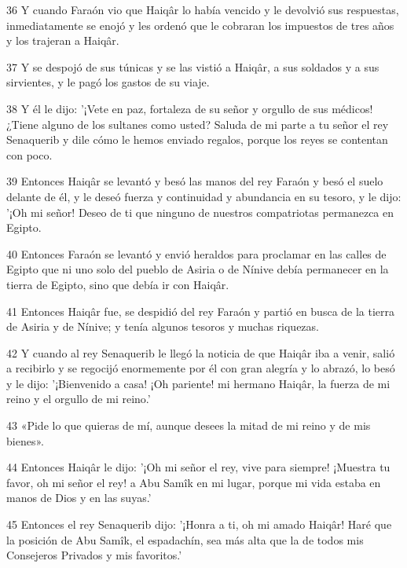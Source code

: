 \par 36 Y cuando Faraón vio que Haiqâr lo había vencido y le devolvió sus respuestas, inmediatamente se enojó y les ordenó que le cobraran los impuestos de tres años y los trajeran a Haiqâr.

\par 37 Y se despojó de sus túnicas y se las vistió a Haiqâr, a sus soldados y a sus sirvientes, y le pagó los gastos de su viaje.

\par 38 Y él le dijo: '¡Vete en paz, fortaleza de su señor y orgullo de sus médicos! ¿Tiene alguno de los sultanes como usted? Saluda de mi parte a tu señor el rey Senaquerib y dile cómo le hemos enviado regalos, porque los reyes se contentan con poco.

\par 39 Entonces Haiqâr se levantó y besó las manos del rey Faraón y besó el suelo delante de él, y le deseó fuerza y ​​continuidad y abundancia en su tesoro, y le dijo: '¡Oh mi señor! Deseo de ti que ninguno de nuestros compatriotas permanezca en Egipto.

\par 40 Entonces Faraón se levantó y envió heraldos para proclamar en las calles de Egipto que ni uno solo del pueblo de Asiria o de Nínive debía permanecer en la tierra de Egipto, sino que debía ir con Haiqâr.

\par 41 Entonces Haiqâr fue, se despidió del rey Faraón y partió en busca de la tierra de Asiria y de Nínive; y tenía algunos tesoros y muchas riquezas.

\par 42 Y cuando al rey Senaquerib le llegó la noticia de que Haiqâr iba a venir, salió a recibirlo y se regocijó enormemente por él con gran alegría y lo abrazó, lo besó y le dijo: '¡Bienvenido a casa! ¡Oh pariente! mi hermano Haiqâr, la fuerza de mi reino y el orgullo de mi reino.'

\par 43 «Pide lo que quieras de mí, aunque desees la mitad de mi reino y de mis bienes».

\par 44 Entonces Haiqâr le dijo: '¡Oh mi señor el rey, vive para siempre! ¡Muestra tu favor, oh mi señor el rey! a Abu Samîk en mi lugar, porque mi vida estaba en manos de Dios y en las suyas.'

\par 45 Entonces el rey Senaquerib dijo: '¡Honra a ti, oh mi amado Haiqâr! Haré que la posición de Abu Samîk, el espadachín, sea más alta que la de todos mis Consejeros Privados y mis favoritos.'

